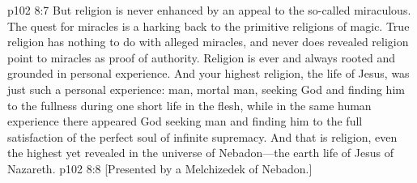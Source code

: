 \vs p102 8:7 But religion is never enhanced by an appeal to the so\hyp{}called miraculous. The quest for miracles is a harking back to the primitive religions of magic. True religion has nothing to do with alleged miracles, and never does revealed religion point to miracles as proof of authority. Religion is ever and always rooted and grounded in personal experience. And your highest religion, the life of Jesus, was just such a personal experience: man, mortal man, seeking God and finding him to the fullness during one short life in the flesh, while in the same human experience there appeared God seeking man and finding him to the full satisfaction of the perfect soul of infinite supremacy. And that is religion, even the highest yet revealed in the universe of Nebadon---the earth life of Jesus of Nazareth.
\vsetoff
\vs p102 8:8 [Presented by a Melchizedek of Nebadon.]

